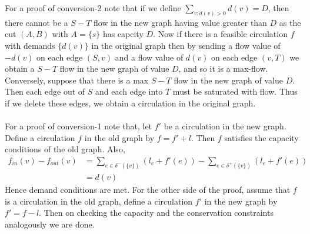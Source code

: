 \documentclass{article}
\begin{document}
        For a proof of conversion-2 note that if we define $\sum_{v:d(v)>0} d(v) = D$, then there cannot be a $S-T$ flow in the new graph having value greater than $D$ as the cut $(A, B)$ with $A= \{s\}$ has capcity $D$. Now if there is a feasible circulation $f$ with demands $\{d(v)\}$ in the original graph then by sending a flow value of $-d(v)$ on each edge $(S, v)$ and a flow value of $d(v)$ on each edge $(v, T)$ we obtain a $S-T$ flow in the new graph of value $D$, and so it is a max-flow. Conversely, suppose that there is a max $S-T$ flow in the new graph of value $D$. Then each edge out of $S$ and each edge into $T$ must be saturated with flow. Thus if we delete these edges, we obtain a circulation in the original graph.\\\\
        For a proof of conversion-1 note that, let $f'$ be a circulation in the new graph. Define a circulation $f$ in the old graph by $f = f' + l$. Then $f$ satisfies the capacity conditions of the old graph. Also, 
        \begin{equation*}
            \begin{split}
                f_{in}(v) - f_{out}(v) &= \sum_{e \in \delta^-(\{v\})} (l_e + f'(e)) - \sum_{e \in \delta^+(\{v\})} (l_e + f'(e))\\
                &= d(v)
            \end{split}
        \end{equation*}
        Hence demand conditions are met. For the other side of the proof, assume that $f$ is a circulation in the old graph, define a circulation $f'$ in the new graph by $f' = f - l$. Then on checking the capacity and the conservation constraints analogously we are done. 
\end{document}
